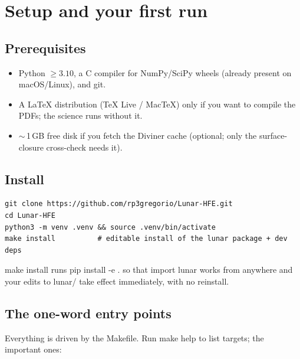 \documentclass[11pt]{report}
\newcommand{\code}[1]{{\ttfamily\small #1}}
\newcommand{\file}[1]{\textcolor{forest}{\ttfamily #1}}
\begin{document}
\chapter{Setup and your first run}

\section{Prerequisites}
\begin{itemize}
\item Python $\geq 3.10$, a C compiler for NumPy/SciPy wheels (already
      present on macOS/Linux), and \code{git}.
\item A LaTeX distribution (TeX Live / MacTeX) only if you want to compile
      the PDFs; the science runs without it.
\item $\sim$\,1\,GB free disk if you fetch the Diviner cache (optional;
      only the surface-closure cross-check needs it).
\end{itemize}

\section{Install}

\begin{lstlisting}[style=sh]
git clone https://github.com/rp3gregorio/Lunar-HFE.git
cd Lunar-HFE
python3 -m venv .venv && source .venv/bin/activate
make install          # editable install of the lunar package + dev deps
\end{lstlisting}

\code{make install} runs \code{pip install -e .} so that \code{import
lunar} works from anywhere and your edits to \file{lunar/} take effect
immediately, with no reinstall.

\section{The one-word entry points}

Everything is driven by the \file{Makefile}. Run \code{make help} to list
targets; the important ones:
\end{document}
